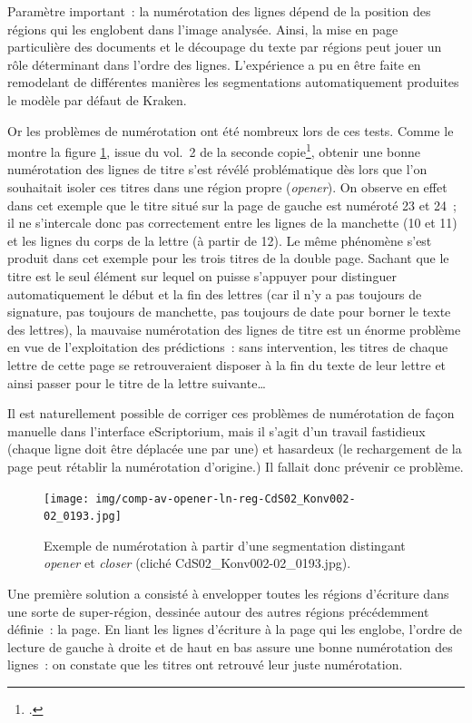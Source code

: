 \documentclass[a4paper,12pt,twoside]{book}
\begin{document}
				Paramètre important~: la numérotation des lignes dépend de la position des régions qui les englobent dans l'image analysée. Ainsi, la mise en page particulière des documents et le découpage du texte par régions peut jouer un rôle déterminant dans l'ordre des lignes. L'expérience a pu en être faite en remodelant de différentes manières les \gls{segmentation}s automatiquement produites le modèle par défaut de Kraken.
				
				Or les problèmes de numérotation ont été nombreux lors de ces tests. Comme le montre la figure \ref{comp-av-opener-ln-reg-193}, issue du vol.~2 de la seconde copie\footcite{CdS02001369}, obtenir une bonne numérotation des lignes de titre s'est révélé problématique dès lors que l'on souhaitait isoler ces titres dans une région propre (\textit{opener}). On observe en effet dans cet exemple que le titre situé sur la page de gauche est numéroté 23 et 24~; il ne s'intercale donc pas correctement entre les lignes de la manchette (10 et 11) et les lignes du corps de la lettre (à partir de 12). Le même phénomène s'est produit dans cet exemple pour les trois titres de la double page. Sachant que le titre est le seul élément sur lequel on puisse s'appuyer pour distinguer automatiquement le début et la fin des lettres (car il n'y a pas toujours de signature, pas toujours de manchette, pas toujours de date pour borner le texte des lettres), la mauvaise numérotation des lignes de titre est un énorme problème en vue de l'exploitation des \glspl{prédiction}~: sans intervention, les titres de chaque lettre de cette page se retrouveraient disposer à la fin du texte de leur lettre et ainsi passer pour le titre de la lettre suivante…
				
				Il est naturellement possible de corriger ces problèmes de numérotation de façon manuelle dans l'interface eScriptorium, mais il s'agit d'un travail fastidieux (chaque ligne doit être déplacée une par une) et hasardeux (le rechargement de la page peut rétablir la  numérotation d'origine.) Il fallait donc prévenir ce problème.
				
				\begin{figure}[!h]
					\centering
					\texttt{[image: img/comp-av-opener-ln-reg-CdS02\_Konv002-02\_0193.jpg]}
					\caption{Exemple de numérotation à partir d'une \gls{segmentation} distingant \textit{opener} et \textit{closer} (cliché CdS02\_Konv002-02\_0193.jpg).}
					\label{comp-av-opener-ln-reg-193}
				\end{figure}
			
				Une première solution a consisté à envelopper toutes les régions d'écriture dans une sorte de super-région, dessinée autour des autres régions précédemment définie~: la page. En liant les lignes d'écriture à la page qui les englobe, l'ordre de lecture de gauche à droite et de haut en bas assure une bonne numérotation des lignes~: on constate que les titres ont retrouvé leur juste numérotation.
				
\end{document}

